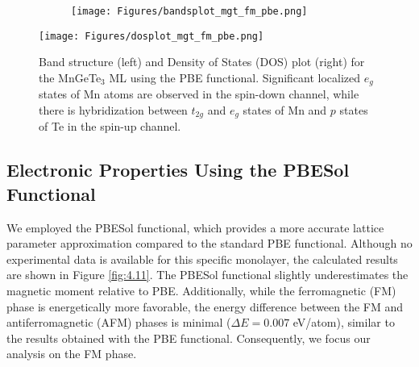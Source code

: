 \begin{figure}[H]
	\begin{subfigure}{.5\textwidth}
		\centering
		\texttt{[image: Figures/bandsplot\_mgt\_fm\_pbe.png]}
	\end{subfigure}%
	\begin{minipage}{.5\textwidth}
		\vspace{-12.75cm}
		\centering
		\texttt{[image: Figures/dosplot\_mgt\_fm\_pbe.png]}
		\captionsetup{justification=centering}
	\end{minipage}
	\caption{Band structure (left) and Density of States (DOS) plot (right) for the MnGeTe$_3$ ML using the PBE functional. Significant localized $e_g$ states of Mn atoms are observed in the spin-down channel, while there is hybridization between $t_{2g}$ and $e_g$ states of Mn and $p$ states of Te in the spin-up channel.}
	\label{fig:4.10}
\end{figure}


\subsection{Electronic Properties Using the PBESol Functional}

We employed the PBESol functional, which provides a more accurate lattice parameter approximation compared to the standard PBE functional. Although no experimental data is available for this specific monolayer, the calculated results are shown in Figure \ref{fig:4.11}. The PBESol functional slightly underestimates the magnetic moment relative to PBE. Additionally, while the ferromagnetic (FM) phase is energetically more favorable, the energy difference between the FM and antiferromagnetic (AFM) phases is minimal ($\Delta E = 0.007$ eV/atom), similar to the results obtained with the PBE functional. Consequently, we focus our analysis on the FM phase.

